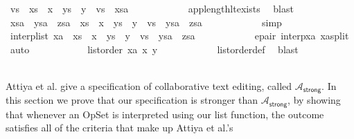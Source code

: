 \begin{isabellebody}
\ vs\ \ {\isachardoublequoteopen}{\isacharparenleft}xs\ {\isacharat}\ x\ {\isacharhash}\ ys\ {\isacharat}\ {\isacharbrackleft}y{\isacharbrackright}{\isacharparenright}\ {\isacharat}\ vs\ {\isacharequal}\ xsa{\isachardoublequoteclose}\isanewline
\ \ \ \ \ \ \ \ \ \ \isamarkupfalse%
\ app{\isacharunderscore}length{\isacharunderscore}lt{\isacharunderscore}exists\ \isamarkupfalse%
\ blast\isanewline
\ \ \ \ \ \ \ \ \isamarkupfalse%
\ {\isachardoublequoteopen}xsa\ {\isacharat}\ ysa\ {\isacharat}\ zsa\ {\isacharequal}\ xs\ {\isacharat}\ {\isacharbrackleft}x{\isacharbrackright}\ {\isacharat}\ ys\ {\isacharat}\ {\isacharbrackleft}y{\isacharbrackright}\ {\isacharat}\ vs\ {\isacharat}\ ysa\ {\isacharat}\ zsa{\isachardoublequoteclose}\isanewline
\ \ \ \ \ \ \ \ \ \ \isamarkupfalse%
\ simp\isanewline
\ \ \ \ \ \ \ \ \isamarkupfalse%
\ {\isachardoublequoteopen}interp{\isacharunderscore}list\ xa\ {\isacharequal}\ xs\ {\isacharat}\ {\isacharbrackleft}x{\isacharbrackright}\ {\isacharat}\ ys\ {\isacharat}\ {\isacharbrackleft}y{\isacharbrackright}\ {\isacharat}\ {\isacharparenleft}vs\ {\isacharat}\ ysa\ {\isacharat}\ zsa{\isacharparenright}{\isachardoublequoteclose}\isanewline
\ \ \ \ \ \ \ \ \ \ \isamarkupfalse%
\ e{\isacharunderscore}pair\ interp{\isacharunderscore}xa\ xa{\isacharunderscore}split\ \isamarkupfalse%
\ auto\isanewline
\ \ \ \ \ \ \ \ \isamarkupfalse%
\ \isamarkupfalse%
\ {\isachardoublequoteopen}list{\isacharunderscore}order\ xa\ x\ y{\isachardoublequoteclose}\isanewline
\ \ \ \ \ \ \ \ \ \ \isamarkupfalse%
\ list{\isacharunderscore}order{\isacharunderscore}def\ \isamarkupfalse%
\ blast\isanewline
\ \ \ \ \ \ \isamarkupfalse%
\isanewline
\ \ \ \ \isamarkupfalse%
\isanewline
\ \ \isamarkupfalse%
\isanewline
{}\isamarkupfalse%
%
\endisatagproof
{\isafoldproof}%
%
\isadelimproof
%
\endisadelimproof
%
\isamarkuptrue%
%
\begin{isamarkuptext}%
Attiya et al. \cite{Attiya:2016kh} give a specification of collaborative
text editing, called $\mathcal{A}_\textsf{strong}$. In this section we prove
that our specification is stronger than $\mathcal{A}_\textsf{strong}$, by
showing that whenever an OpSet is interpreted using our list function, the
outcome satisfies all of the criteria that make up Attiya et al.'s

\end{isamarkuptext}
\end{isabellebody}
